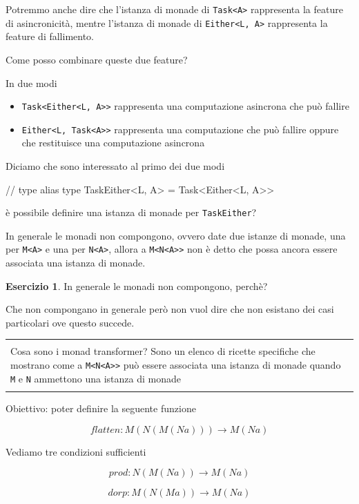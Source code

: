 \documentclass[12pt]{article}
\theoremstyle{definition}
\newtheorem{exercise}{Esercizio}[section]
\newenvironment{demo}
    {\begin{center}
    \begin{tabular}{|p{0.9\textwidth}|}
    \hline\\
    }
    {
    \\\\\hline
    \end{tabular}
    \end{center}
    }
\newenvironment{code}
  {\vspace{0.5cm} \VerbatimEnvironment\begin{typescriptcode}}
  {\end{typescriptcode} \vspace{0.2cm}}
\begin{document}
Potremmo anche dire che l'istanza di monade di \texttt{Task<A>} rappresenta la feature di asincronicità, mentre l'istanza
di monade di \texttt{Either<L, A>} rappresenta la feature di fallimento.

Come posso combinare queste due feature?

In due modi

\begin{itemize}
\item \texttt{Task<Either<L, A>>} rappresenta una computazione asincrona che può fallire
\item \texttt{Either<L, Task<A>>} rappresenta una computazione che può fallire oppure che restituisce una computazione asincrona
\end{itemize}

Diciamo che sono interessato al primo dei due modi

\begin{code}
// type alias
type TaskEither<L, A> = Task<Either<L, A>>
\end{code}

è possibile definire una istanza di monade per \texttt{TaskEither}?

In generale le monadi non compongono, ovvero date due istanze di monade, una per \texttt{M<A>} e una per \texttt{N<A>},
allora a \texttt{M<N<A>>} non è detto che possa ancora essere associata una istanza di monade.

\begin{exercise}
In generale le monadi non compongono, perchè?
\end{exercise}

Che non compongano in generale però non vuol dire che non esistano dei casi particolari ove questo succede.

\begin{demo}
Cosa sono i monad transformer?
Sono un elenco di ricette specifiche che mostrano come a \texttt{M<N<A>>} può essere associata una istanza di monade
quando \texttt{M} e \texttt{N} ammettono una istanza di monade
\end{demo}

Obiettivo: poter definire la seguente funzione

$$
flatten: M ( N ( M ( N a ) ) ) \rightarrow M ( N a )
$$

Vediamo tre condizioni sufficienti

$$
prod: N (M ( N a ) ) \rightarrow M( N a )
$$

$$
dorp: M (N ( M a ) ) \rightarrow M ( N a )
$$
\end{document}
